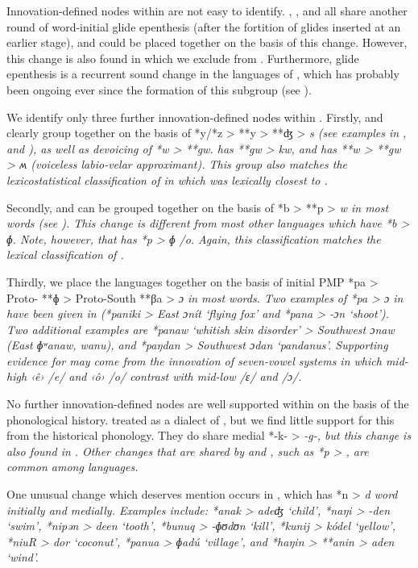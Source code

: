 Innovation-defined nodes within  are not easy to identify.
, , and  all share another round of word-initial
glide epenthesis (after the fortition of glides inserted at an
earlier stage), and could be placed together on the basis of this change.
However, this change is also found in  which we exclude from .
Furthermore, glide epenthesis is a recurrent sound change in
the languages of , which has probably been ongoing ever since
the formation of this subgroup (see ).

We identify only three further innovation-defined nodes within .
Firstly,  and  clearly group together on the basis of
*y/*z > **y > **ʤ > \it{s} (see examples in ,
and ), as well as devoicing of *w > **gw.
 has **gw > \it{kw},
and  has **w > **gw > \it{ʍ} (voiceless labio-velar approximant).
This group also matches the lexicostatistical classification
of \citet{Hughes1987} in which  was lexically closest to .

Secondly,  and  can be grouped together on the basis
of *b > **p > \it{w} in most words (see ).
This change is different from most other  languages
which have *b > \it{ɸ.} Note,
however, that  has *p > \it{ɸ} /{\gap}o.
Again, this classification matches the lexical classification of \citet{Hughes1987}.

Thirdly, we place the  languages together on the
basis of initial PMP *pa > Proto- **ɸ > Proto-South  **βa
> \it{ɔ} in most words.
Two examples of *pa > \it{ɔ} in  have been given
in  (*paniki > East  \it{ɔnít} ‘flying fox’
and *pana >  \it{-ɔn} ‘shoot’).
Two additional examples are *panaw ‘whitish skin disorder’ >
Southwest  \it{ɔnaw} (East  \it{ɸʷanaw},
 \it{wanu}), and *paŋdan > Southwest  \it{ɔdan} ‘pandanus’.
Supporting evidence for  may come from
the innovation of seven-vowel systems in which mid-high ‹ê›
/e/ and ‹ô› /o/ contrast with mid-low /ɛ/ and /ɔ/.

No further innovation-defined nodes are well supported within
 on the basis of the phonological history.
\citet{Hughes1987} treated  as a dialect of ,
but we find little support for this from the historical phonology.
They do share medial *-k- > \it{-g-},
but this change is also found in .
Other changes that are shared by 
and , such as *p > {\0},
are common among  languages.

One unusual change which deserves mention occurs in ,
which has *n > \it{d} word initially and medially.
Examples include: *anak > \it{adeʤ} ‘child’,
*naŋi > \it{-den} ‘swim’,
*nipən > \it{deen} ‘tooth’,
*bunuq > \it{-ɸʊdʊn} ‘kill’,
*kunij > \it{kódel} ‘yellow’,
*niuR > \it{dor} ‘coconut’,
*panua > \it{ɸadú} ‘village’,
and *haŋin > **anin > \it{aden} ‘wind’.


